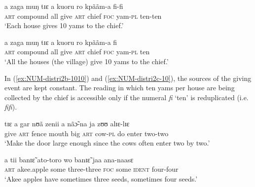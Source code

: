 \begin{exe}
\begin{exe}
\begin{exe}
{\begin{exe}
\begin{exe}
\begin{exe}
\begin{exe}
\begin{exe}
\begin{exe}
\begin{exe}
\begin{xlist}
\begin{exe}
\begin{exe}
\begin{exe}
\begin{exe}
\begin{xlist}
\ex\label{ex:NUM-distri2b-1010}{\it }
\gll a  zaga  muŋ tɪɛ  a  kuoru ro  kpããm-a  fi-fi\\
  \textsc{art} {compound} {all} {give}  \textsc{art}  {chief}  \textsc{foc}
yam-\textsc{pl}  {ten-ten}      \\
\glt  `Each house gives 10 yams to the chief.'

\ex\label{ex:NUM-distri2c-10}{\it }
\gll a  zaga  muŋ tɪɛ  a   kuoru ro kpããm-a  fi \\
  \textsc{art} {compound} {all} {give}  \textsc{art}  {chief}  \textsc{foc}
yam-\textsc{pl}  ten     \\
\glt  `All the houses (the village) give 10 yams to the chief.'
\end{xlist}
\end{exe}


In (\ref{ex:NUM-distri2b-1010}) and (\ref{ex:NUM-distri2c-10}), the sources of
the giving event are kept constant. The reading in which
ten yams per house are being collected by the chief is accessible only
if the numeral {\it fi}  `ten' is reduplicated (i.e.  {\it fifi}).

\ea
\ea\label{ex:NUM-door-two-two}

 \gll  tɪɛ  a gar  nʊã zenii  a nãɔ̃-na  ja  zʊʊ  alɪɛ-lɪɛ\\
  {give}   \textsc{art}  {fence}  {mouth}   {big}  \textsc{art} 
{cow-\textsc{pl}}   {do} {enter} {two-two}       \\
\glt  `Make the door large enough since the cows often enter two by two.'\\


\ex\label{ex:NUM-akee-apple-three-four}

 \gll  a tii banɪɛ̃ ato-toro  wo banɪɛ̃ jaa ana-naasɛ\\
 \textsc{art}  {akee.apple}  {some}   {three-three}  \textsc{foc}  {some}   
\textsc{ident} {four-four}   \\
\glt  `Akee apples have sometimes  three seeds, sometimes four seeds.'\\

\z
\z


 




\end{exe}
\end{exe}
\end{exe}
\end{xlist}
\end{exe}
\end{exe}
\end{exe}
\end{exe}
\end{exe}
\end{exe}
\end{exe}}
\end{exe}
\end{exe}
\end{exe}
